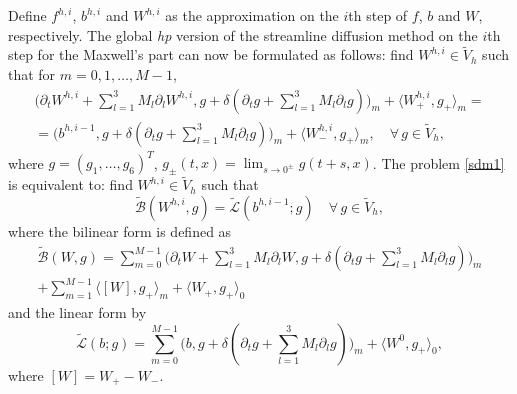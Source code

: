 \documentclass[reqno,a4paper]{amsart}
\theoremstyle{remark}
\numberwithin{equation}{section}
\newcommand{\sprod}[2]{\langle #1, #2 \rangle}
\def\d{\partial}
\def\Bt{\tilde{\mathcal{B}}}
\def\Lt{\tilde{\mathcal{L}}}
\begin{document}
Define $f^{h,i}$, $b^{h,i}$ and $W^{h,i}$ as the approximation on the $i$th step
of $f$, $b$ and $W$, respectively.
The global \textit{hp} version of the streamline diffusion method on 
the $i$th step
for the Maxwell's part can now be formulated as follows: 
find $W^{h,i}\in\tilde{V}_h$ such that for $m=0, 1, \ldots , M-1$,
\begin{multline}\label{sdm1}
\Big(\d_t W^{h,i}+\sum_{l=1}^3 M_l\d_l W^{h,i},
g+\delta (\d_t g+\sum_{l=1}^3 M_l\d_l g)\Big)_m + \sprod{W^{h,i}_+}{g_+}_m= \\
= \Big(b^{h,i-1}, g+\delta (\d_t g+\sum_{l=1}^3 M_l\d_l g)\Big)_m 
+ \sprod{W^{h,i}_-}{g_+}_m,
\quad \forall \, g\in \tilde{V}_h,
\end{multline}
where $g = (g_1,\ldots,g_6)^T $, $ g_\pm (t,x) = 
\lim_{s \rightarrow 0^\pm} g(t+s, x)$. 
The problem \eqref{sdm1} is equivalent to: 
find $W^{h,i}\in\tilde{V}_h$ such that
\begin{equation} \label{sdm2}
\Bt (W^{h,i}, g) = \Lt (b^{h,i-1};g) \quad \forall \, g \in \tilde{V}_h,
\end{equation}
where the bilinear form is defined as
\begin{multline*}
\Bt (W,g)= \sum_{m=0}^{M-1} \Big(\d_t W + \sum_{l=1}^3 M_l\d_l W,
g + \delta (\d_t g + \sum_{l=1}^3 M_l\d_l g)\Big)_m \\
+ \sum_{m=1}^{M-1} \sprod{[ W ]}{g_+}_m + \sprod{W_+}{g_+}_0
\end{multline*}
and the linear form by
$$
\Lt (b;g) = 
\sum_{m=0}^{M-1} \Big(b, g + \delta (\d_t g +\sum_{l=1}^3 M_l\d_l g)\Big)_m
+ \sprod{W^0}{g_+}_0,
$$
where $ [ W ] = W_+ - W_- $.
\end{document}
